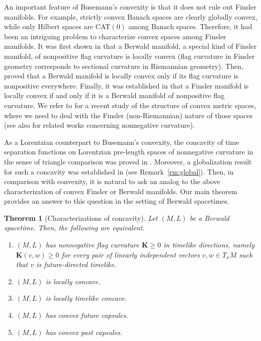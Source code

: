\documentclass[a4paper,11pt]{article}
\numberwithin{equation}{section}
\theoremstyle{definition}
\theoremstyle{plain}
\newtheorem{theorem}[definition]{Theorem}
\newcommand{\bK}{\mathbf{K}}
\begin{document}
An important feature of Busemann's convexity is that it does not rule out Finsler manifolds.
For example, strictly convex Banach spaces are clearly globally convex,
while only Hilbert spaces are CAT$(0)$ among Banach spaces.
Therefore, it had been an intriguing problem to characterize convex spaces among Finsler manifolds.
It was first shown in \cite{KVK} that a Berwald manifold, a special kind of Finsler manifold,
of nonpositive flag curvature is locally convex
(flag curvature in Finsler geometry corresponds to sectional curvature in Riemannian geometry).
Then, \cite{KK} proved that a Berwald manifold is locally convex only if its flag curvature is nonpositive everywhere.
Finally, it was established in \cite{IL} that a Finsler manifold is locally convex if and only if
it is a Berwald manifold of nonpositive flag curvature.
We refer to \cite{FG} for a recent study of the structure of convex metric spaces,
where we need to deal with the Finsler (non-Riemannian) nature of those spaces (see also \cite{Ke,HY} for related works concerning nonnegative curvature).

As a Lorentzian counterpart to Busemann's convexity,
the concavity of time separation functions on Lorentzian pre-length spaces
of nonnegative curvature in the sense of triangle comparison
was proved in \cite[Section~6]{BKR}.
Moreover, a globalization result for such a concavity was established in \cite{EG} (see Remark~\ref{rm:global}).
Then, in comparison with convexity, it is natural to ask an analog to the above characterization of convex Finsler or Berwald manifolds.
Our main theorem provides an answer to this question in the setting of Berwald spacetimes.

\begin{theorem}[Characterizations of concavity]\label{th:main}
Let $(M,L)$ be a Berwald spacetime.
Then, the following are equivalent.
\begin{enumerate}[{\rm (I)}]
\item\label{it:K>0} $(M,L)$ has nonnegative flag curvature $\bK \ge 0$ in timelike directions, namely $\bK(v,w) \ge 0$ for every pair of linearly independent vectors $v,w \in T_xM$ such that $v$ is future-directed timelike.
\item\label{it:ccv} $(M,L)$ is locally concave.
\item\label{it:c-ccv} $(M,L)$ is locally timelike concave.
\item\label{it:f-cap} $(M,L)$ has convex future capsules.
\item\label{it:p-cap} $(M,L)$ has convex past capsules.
\end{enumerate}
\end{theorem}
\end{document}
